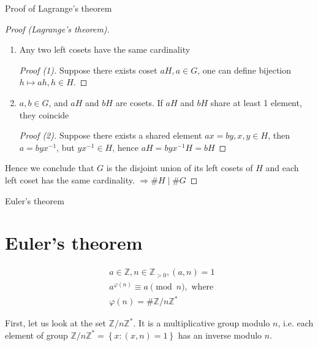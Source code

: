 \documentclass{beamer}
\begin{document}
\begin{frame}{Proof of Lagrange's theorem}
	\begin{proof}[Proof (Lagrange's theorem)]
		\begin{enumerate}
			\item Any two left cosets have the same cardinality
			\begin{proof}[Proof (1)]
				Suppose there exists coset $aH, a \in G$, one can define bijection $h \mapsto ah, h \in H$.
			\end{proof}
			\item $a, b \in G$, and $aH$ and $bH$ are cosets. If $aH$ and $bH$ share at least 1 element, they coincide
			\begin{proof}[Proof (2)]
			Suppose there exists a shared element $ax = by, x,y \in H$, then $a = byx^{-1}$, but $yx^{-1} \in H$, hence
			$aH = byx^{-1}H = bH$
			\end{proof}
		\end{enumerate}
		Hence we conclude that $G$ is the disjoint union of its left cosets of $H$ and each left coset has the same 
		cardinality. \newline
		$\Rightarrow \# H \mid \# G$
	\end{proof}
\end{frame}

\begin{frame}{Euler's theorem}
	\section{Euler's theorem}
	\begin{Theorem}
		\begin{align*}
			& a \in \mathbb{Z}, n \in \mathbb{Z}_{>0}, (a, n) = 1 \\
			& a^{\varphi(n)} \equiv a \pmod n, \text{ where } \\
			& \varphi(n) = \# \mathbb{Z} / n \mathbb{Z}^*
		\end{align*}
    \end{Theorem}
	First, let us look at the set $\mathbb{Z} / n \mathbb{Z}^*$. It is a multiplicative group modulo $n$, i.e. 
	each element of group $\mathbb{Z} / n \mathbb{Z}^* = \left\{ x : (x, n) = 1 \right\}$ has an inverse modulo $n$.
\end{frame}
\end{document}
